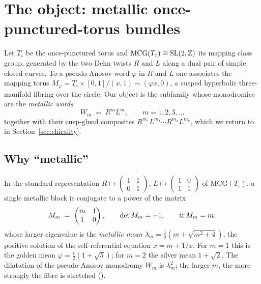 \section{The object: metallic once-punctured-torus bundles}
\label{sec:object}

Let $T_\circ$ be the once-punctured torus and $\mathrm{MCG}(T_\circ)\cong\mathrm{SL}(2,\mathbb{Z})$ its
mapping class group, generated by the two Dehn twists $R$ and $L$ along a dual pair of
simple closed curves. To a pseudo-Anosov word $\varphi$ in $R$ and $L$ one associates
the mapping torus $M_\varphi = T_\circ\times[0,1]/(x,1)\sim(\varphi x,0)$, a cusped
hyperbolic three-manifold fibring over the circle. Our object is the subfamily whose
monodromies are the \emph{metallic words}
\begin{equation}
  W_m \;=\; R^m L^m,\qquad m=1,2,3,\dots
\end{equation}
together with their cusp-glued composites $R^{m_1}L^{m_1}\cdots R^{m_k}L^{m_k}$, which we
return to in Section~\ref{sec:chirality}.

\subsection{Why ``metallic''}

In the standard representation $R\mapsto\left(\begin{smallmatrix}1&1\\0&1\end{smallmatrix}\right)$,
$L\mapsto\left(\begin{smallmatrix}1&0\\1&1\end{smallmatrix}\right)$ of
$\mathrm{MCG}(T_\circ)$, a single metallic block is conjugate to a power of the matrix
\begin{equation}
  M_m \;=\; \begin{pmatrix} m & 1 \\ 1 & 0 \end{pmatrix},
  \qquad \det M_m = -1,\qquad \operatorname{tr} M_m = m,
\end{equation}
whose larger eigenvalue is the \emph{metallic mean}
$\lambda_m=\tfrac12\!\left(m+\sqrt{m^2+4}\right)$, the positive solution of the
self-referential equation $x = m + 1/x$. For $m=1$ this is the golden mean
$\varphi=\tfrac12(1+\sqrt5)$; for $m=2$ the silver mean $1+\sqrt2$. The dilatation of the
pseudo-Anosov monodromy $W_m$ is $\lambda_m^2$; the larger $m$, the more strongly the
fibre is stretched ().

